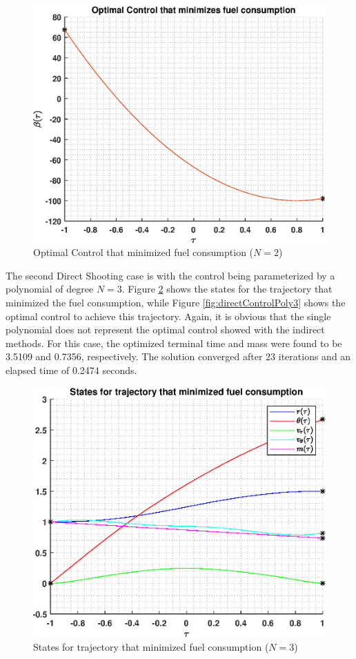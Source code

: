 \documentclass[]{article}
\begin{document}
\begin{figure}
	\centering
	\includegraphics[scale=0.75]{directControlPoly2.eps}
	\caption{Optimal Control that minimized fuel consumption  (\(N = 2\))}
	\label{fig:directControlPoly2}
\end{figure}
\vspace{2mm}\newline 
The second Direct Shooting case is with the control being parameterized by a polynomial of degree \(N = 3\). Figure \ref{fig:directStatesPoly3} shows the states for the trajectory that minimized the fuel consumption, while Figure \ref{fig:directControlPoly3} shows the optimal control to achieve this trajectory. Again, it is obvious that the single polynomial does not represent the optimal control showed with the indirect methods. For this case, the optimized terminal time and mass were found to be 3.5109 and 0.7356, respectively. The solution converged after 23 iterations and an elapsed time of 0.2474 seconds.
\begin{figure}
	\centering
	\includegraphics[scale=0.75]{directStatesPoly3.eps}
	\caption{States for trajectory that minimized fuel consumption (\(N = 3\))}
	\label{fig:directStatesPoly3}
\end{figure}
\end{document}
